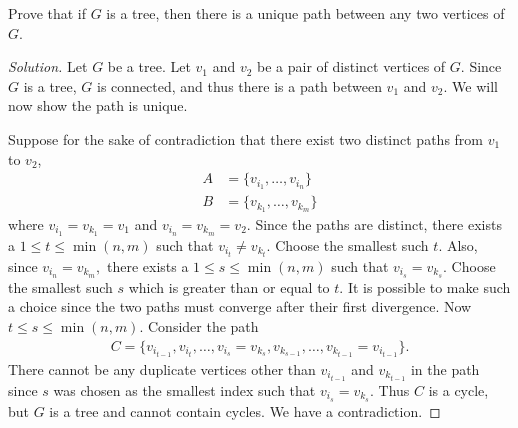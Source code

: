 \documentclass[12pt]{article}
\newenvironment{exercise}[2][Exercise]{\begin{trivlist}
        \item[\hskip \labelsep {\bfseries #1}\hskip \labelsep {\bfseries #2.}]}{\end{trivlist}}
\newenvironment{solution}
        {\begin{proof}[Solution]}
                    {\end{proof}}
\begin{document}
\begin{exercise}{51}
    Prove that if \( G \) is a tree, then there is a unique path between any two vertices of \( G. \)
    \begin{solution}
        Let \( G \) be a tree. Let \( v_{1} \) and \( v_{2} \) be a pair of distinct vertices of \( G. \) Since \( G \) is a tree, \( G \) is connected, and thus there is a path between \( v_{1} \) and \( v_{2} . \) We will now show the path is unique.

        Suppose for the sake of contradiction that there exist two distinct paths from \( v_{1} \) to \( v_{2}  \),
        \begin{align*}
            A &= \{v_{i_{1}} , \dots , v_{i_{n}}\} \\
            B &= \{v_{k_{1}} , \dots , v_{k_{m}}\}
        \end{align*}
        where \( v_{i_{1}} = v_{k_{1}} = v_{1} \) and \( v_{i_{n}} = v_{k_{m}} = v_{2} . \) Since the paths are distinct, there exists a \(1 \leq  t \leq \min(n,m)\) such that \( v_{i_{t}} \neq v_{k_{t}}  .\) Choose the smallest such \( t. \) Also, since \( v_{i_{n}} = v_{k_{m}} , \) there exists a \( 1 \leq s \leq \min(n,m) \) such that \( v_{i_{s}} = v_{k_{s}} . \) Choose the smallest such \( s \) which is greater than or equal to \( t. \) It is possible to make such a choice since the two paths must converge after their first divergence. Now \(t \leq s \leq \min(n,m) \). Consider the path
        \begin{align*}
            C = \{v_{i_{t-1}} , v_{i_{t}} , \dots , v_{i_{s}} = v_{k_{s}} , v_{k_{s-1}} , \dots , v_{k_{t-1}} = v_{i_{t-1}}\} .
        \end{align*}
        There cannot be any duplicate vertices other than \( v_{i_{t-1}} \) and \( v_{k_{t-1}} \) in the path since \( s \) was chosen as the smallest index such that \( v_{i_{s}} = v_{k_{s}} . \) Thus \( C \) is a cycle, but \( G \) is a tree and cannot contain cycles. We have a contradiction.

    \end{solution}
\end{exercise}
\end{document}
